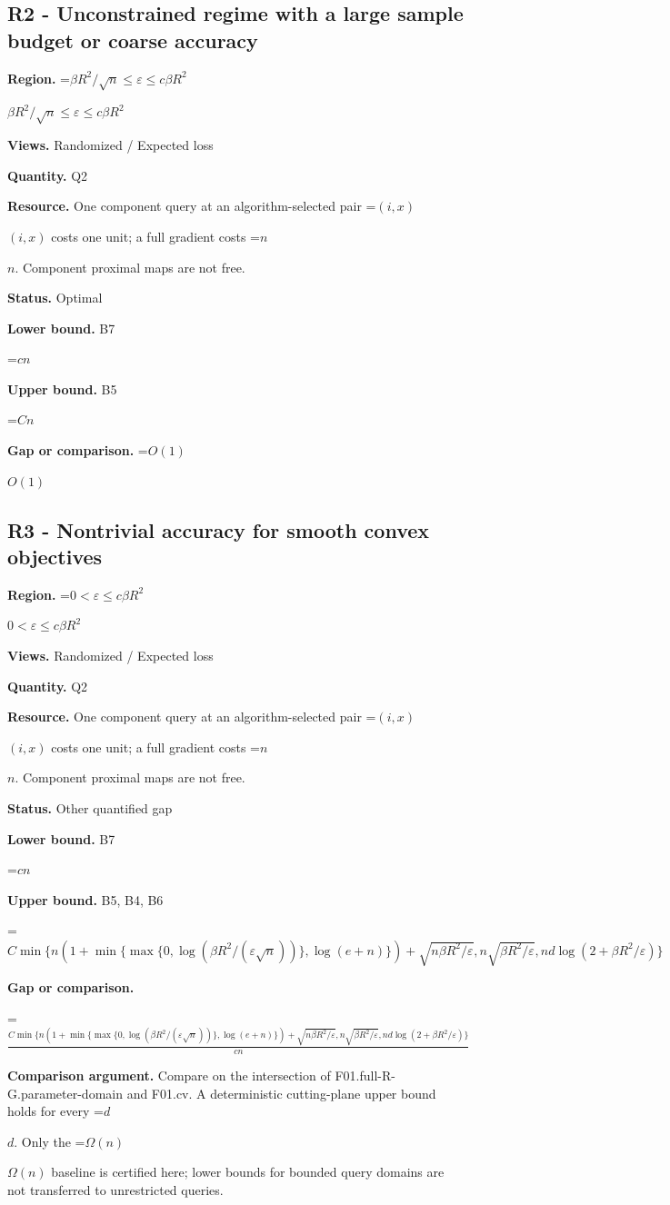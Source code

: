 \documentclass[10pt,a4paper]{article}
\newcommand{\AtlasMath}[1]{\par\begingroup\centering\setbox0=\hbox{$\displaystyle #1$}\ifdim\wd0>1.4\linewidth\typeout{ATLAS WIDE FORMULA: \the\wd0}\fi\ifdim\wd0>\linewidth\resizebox{\linewidth}{!}{\box0}\else\box0\fi\par\endgroup}
\newcommand{\AtlasInlineMath}[1]{\begingroup\setbox0=\hbox{$#1$}\ifdim\wd0>.4\linewidth\endgroup\AtlasMath{#1}\else\endgroup$#1$\fi}
\begin{document}
\subsection{R2 - Unconstrained regime with a large sample budget or coarse accuracy}
\textbf{Region.} \AtlasInlineMath{\beta R^2/\sqrt n\le\varepsilon\le c\beta R^2}

\textbf{Views.} Randomized / Expected loss

\textbf{Quantity.} Q2

\textbf{Resource.} One component query at an algorithm-selected pair \AtlasInlineMath{(i,x)} costs one unit; a full gradient costs \AtlasInlineMath{n}. Component proximal maps are not free.

\textbf{Status.} Optimal

\textbf{Lower bound.} B7

\AtlasMath{cn}
\textbf{Upper bound.} B5

\AtlasMath{Cn}
\textbf{Gap or comparison.} \AtlasInlineMath{O(1)}

\subsection{R3 - Nontrivial accuracy for smooth convex objectives}
\textbf{Region.} \AtlasInlineMath{0<\varepsilon\le c\beta R^2}

\textbf{Views.} Randomized / Expected loss

\textbf{Quantity.} Q2

\textbf{Resource.} One component query at an algorithm-selected pair \AtlasInlineMath{(i,x)} costs one unit; a full gradient costs \AtlasInlineMath{n}. Component proximal maps are not free.

\textbf{Status.} Other quantified gap

\textbf{Lower bound.} B7

\AtlasMath{cn}
\textbf{Upper bound.} B5, B4, B6

\AtlasMath{C\min\{n(1+\min\{\max\{0,\log(\beta R^2/(\varepsilon\sqrt n))\},\log(e+n)\})+\sqrt{n\beta R^2/\varepsilon},n\sqrt{\beta R^2/\varepsilon},nd\log(2+\beta R^2/\varepsilon)\}}
\textbf{Gap or comparison.} 
\AtlasMath{\frac{C\min\{n(1+\min\{\max\{0,\log(\beta R^2/(\varepsilon\sqrt n))\},\log(e+n)\})+\sqrt{n\beta R^2/\varepsilon},n\sqrt{\beta R^2/\varepsilon},nd\log(2+\beta R^2/\varepsilon)\}}{cn}}


\textbf{Comparison argument.} Compare on the intersection of F01.full-R-G.parameter-domain and F01.cv. A deterministic cutting-plane upper bound holds for every \AtlasInlineMath{d}. Only the \AtlasInlineMath{\Omega(n)} baseline is certified here; lower bounds for bounded query domains are not transferred to unrestricted queries.
\end{document}
